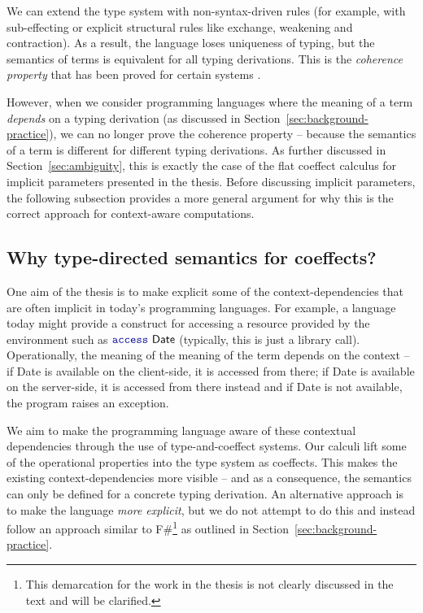 \documentclass[
		twoside,openright,titlepage,numbers=noenddot,headinclude,%
                footinclude=true,cleardoublepage=empty,
                BCOR=10mm,paper=a4,fontsize=10pt, %
                ngerman,american, %
                ]{scrreprt}
\newcommand{\kvd}[1]{\textnormal{\textcolor{kvdclr}{\ttfamily #1}}}
\newcommand{\ident}[1]{\textnormal{\sffamily #1}}
\begin{document}
We can extend the type system with non-syntax-driven rules (for example, with sub-effecting or
explicit structural rules like exchange, weakening and contraction). As a result, the language
loses uniqueness of typing, but the semantics of terms is equivalent for all typing derivations.
This is the \emph{coherence property} that has been proved for certain systems
\cite{semantics-bltres}.

However, when we consider programming languages where the meaning of a term \emph{depends} on a
typing derivation (as discussed in Section~\ref{sec:background-practice}), we can no longer
prove the coherence property -- because the semantics of a term is different for different
typing derivations. As further discussed in Section~\ref{sec:ambiguity}, this is exactly the case
of the flat coeffect calculus for implicit parameters presented in the thesis. Before discussing
implicit parameters, the following subsection provides a more general argument for why this is the
correct approach for context-aware computations.

\subsection{Why type-directed semantics for coeffects?}

One aim of the thesis is to make explicit some of the context-dependencies that are often implicit
in today's programming languages. For example, a language today might provide a construct for
accessing a resource provided by the environment such as $\kvd{access}~\ident{Date}$ (typically,
this is just a library call). Operationally, the meaning of the meaning of the term depends on
the context -- if \ident{Date} is available on the client-side, it is accessed from there; if
\ident{Date} is available on the server-side, it is accessed from there instead and if \ident{Date}
is not available, the program raises an exception.

We aim to make the programming language aware of these contextual dependencies through the use
of type-and-coeffect systems. Our calculi lift some of the operational properties into the type
system as coeffects. This makes the existing context-dependencies more visible -- and as a
consequence, the semantics can only be defined for a concrete typing derivation. An alternative
approach is to make the language \emph{more explicit}, but we do not attempt to do this and
instead follow an approach similar to F\#\footnote{This demarcation for the work
in the thesis is not clearly discussed in the text and will be clarified.} as outlined in
Section~\ref{sec:background-practice}.
\end{document}

